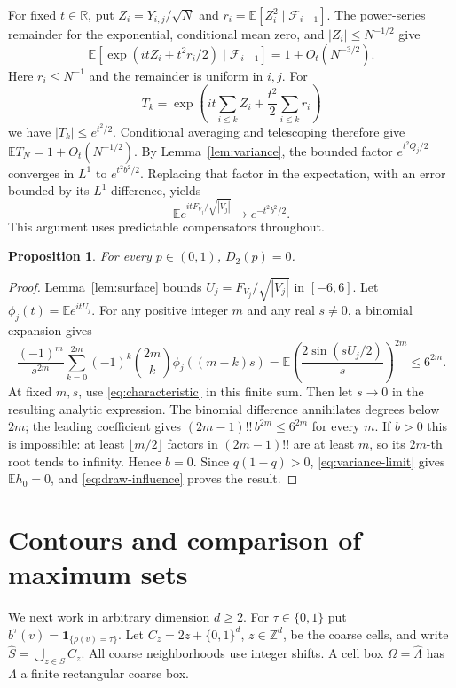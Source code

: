 \documentclass[11pt,a4paper]{article}
\newcommand{\Z}{\mathbb Z}
\newcommand{\R}{\mathbb R}
\newcommand{\E}{\mathbb E}
\newcommand{\indicator}{\mathbf 1}
\newtheorem{proposition}[theorem]{Proposition}
\numberwithin{equation}{section}
\begin{document}
For fixed $t\in\R$, put $Z_i=Y_{i,j}/\sqrt N$ and
$r_i=\E[Z_i^2\mid\mathcal F_{i-1}]$.
The power-series remainder for the exponential, conditional mean zero,
and $|Z_i|\le N^{-1/2}$ give
\[
 \E[\exp(itZ_i+t^2r_i/2)\mid\mathcal F_{i-1}]
 =1+O_t(N^{-3/2}).
\]
Here $r_i\le N^{-1}$ and the remainder is uniform in $i,j$.
For
\[
 T_k=\exp\left(it\sum_{i\le k}Z_i+
                    \frac{t^2}{2}\sum_{i\le k}r_i\right)
\]
we have $|T_k|\le e^{t^2/2}$. Conditional averaging and telescoping
therefore give $\E T_N=1+O_t(N^{-1/2})$.
By Lemma~\ref{lem:variance}, the bounded factor $e^{t^2Q_j/2}$
converges in $L^1$ to $e^{t^2b^2/2}$. Replacing that factor in the
expectation, with an error bounded by its $L^1$ difference, yields
\begin{equation}\label{eq:characteristic}
 \E e^{itF_{V_j}/\sqrt{|V_j|}}\longrightarrow e^{-t^2b^2/2}.
\end{equation}
This argument uses predictable compensators throughout.

\begin{proposition}\label{prop:planar}
For every $p\in(0,1)$, $D_2(p)=0$.
\end{proposition}
\begin{proof}
Lemma~\ref{lem:surface} bounds $U_j=F_{V_j}/\sqrt{|V_j|}$ in $[-6,6]$.
Let $\phi_j(t)=\E e^{itU_j}$.
For any positive integer $m$ and any real $s\ne0$, a binomial expansion gives
\[
 \frac{(-1)^m}{s^{2m}}\sum_{k=0}^{2m}(-1)^k
       \binom{2m}{k}\phi_j((m-k)s)
 =\E\left(\frac{2\sin(sU_j/2)}s\right)^{2m}
 \le6^{2m}.
\]
At fixed $m,s$, use \eqref{eq:characteristic} in this finite sum.
Then let $s\to0$ in the resulting analytic expression.
The binomial difference annihilates degrees below $2m$; the leading
coefficient gives $(2m-1)!!\,b^{2m}\le6^{2m}$ for every $m$.
If $b>0$ this is impossible: at least $\lfloor m/2\rfloor$ factors in
$(2m-1)!!$ are at least $m$, so its $2m$-th root tends to infinity.
Hence $b=0$. Since $q(1-q)>0$, \eqref{eq:variance-limit} gives
$\E h_0=0$, and \eqref{eq:draw-influence} proves the result.
\end{proof}


\section{Contours and comparison of maximum sets}\label{sec:contours}
We next work in arbitrary dimension $d\ge2$.
For $\tau\in\{0,1\}$ put $b^\tau(v)=\indicator_{\{\rho(v)=\tau\}}$.
Let $C_z=2z+\{0,1\}^d$, $z\in\Z^d$, be the coarse cells, and write
$\widehat S=\bigcup_{z\in S}C_z$.
All coarse neighborhoods use integer shifts.
A cell box $\Omega=\widehat\Lambda$ has $\Lambda$ a finite rectangular
coarse box.
\end{document}
